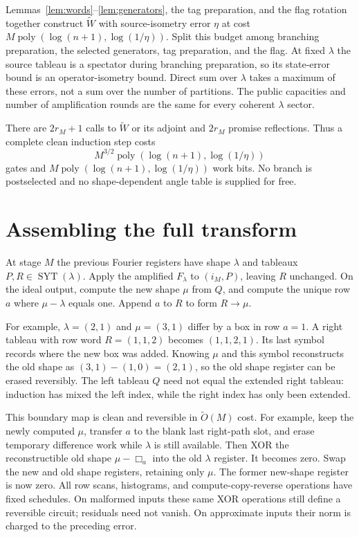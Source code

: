 \documentclass[11pt]{article}
\theoremstyle{definition}
\newcommand{\poly}{\operatorname{poly}}
\newcommand{\SYT}{\operatorname{SYT}}
\begin{document}
Lemmas~\ref{lem:words}--\ref{lem:generators}, the tag preparation, and the
flag rotation together construct $\widetilde W$ with source-isometry
error $\eta$ at cost $M\poly(\log(n+1),\log(1/\eta))$. Split this budget
among branching preparation, the selected generators, tag preparation,
and the flag. At fixed $\lambda$ the source tableau is a spectator during
branching preparation, so its state-error bound is an operator-isometry
bound. Direct sum over $\lambda$ takes a maximum of these errors, not a
sum over the number of partitions. The public capacities and number of
amplification rounds are the same for every coherent $\lambda$ sector.

There are $2r_M+1$ calls to $\widetilde W$ or its adjoint and $2r_M$
promise reflections. Thus a complete clean induction step costs
\begin{equation}\label{eq:stagecost}
 M^{3/2}\poly(\log(n+1),\log(1/\eta))
\end{equation}
gates and $M\poly(\log(n+1),\log(1/\eta))$ work bits. No branch is
postselected and no shape-dependent angle table is supplied for free.

\section{Assembling the full transform}\label{sec:composition}

At stage $M$ the previous Fourier registers have shape $\lambda$ and
tableaux $P,R\in\SYT(\lambda)$. Apply the amplified $F_\lambda$ to
$(i_M,P)$, leaving $R$ unchanged. On the ideal output, compute the new
shape $\mu$ from $Q$, and compute the unique row $a$ where $\mu-\lambda$
equals one. Append $a$ to $R$ to form $R\to\mu$.

For example, $\lambda=(2,1)$ and $\mu=(3,1)$ differ by a box in row
$a=1$. A right tableau with row word $R=(1,1,2)$ becomes $(1,1,2,1)$.
Its last symbol records where the new box was added. Knowing $\mu$ and
this symbol reconstructs the old shape as $(3,1)-(1,0)=(2,1)$, so the
old shape register can be erased reversibly. The left tableau $Q$ need
not equal the extended right tableau: induction has mixed the left
index, while the right index has only been extended.

This boundary map is clean and reversible in $\widetilde O(M)$ cost.
For example, keep the newly computed $\mu$, transfer $a$ to the blank
last right-path slot, and erase temporary difference work while $\lambda$
is still available. Then XOR the reconstructible old shape
$\mu-\Box_a$ into the old $\lambda$ register. It becomes zero. Swap the
new and old shape registers, retaining only $\mu$. The former new-shape
register is now zero. All row scans, histograms, and compute-copy-reverse
operations have fixed schedules. On malformed inputs these same XOR
operations still define a reversible circuit; residuals need not vanish.
On approximate inputs their norm is charged to the preceding error.
\end{document}

